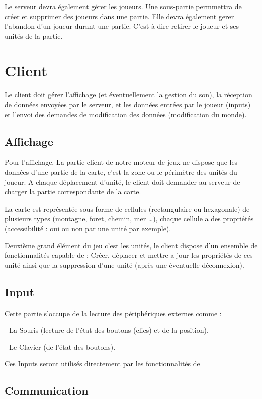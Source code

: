 \documentclass[a4paper,10pt]{report}
\begin{document}
	Le serveur devra également gérer les joueurs. Une sous-partie permmettra de créer et supprimer des joueurs dans une partie. Elle devra également gerer l'abandon d'un joueur durant une partie. C'est à dire retirer le joueur et ses unités de la partie.

    \section{Client}

      Le client doit gérer l'affichage (et éventuellement la gestion du son), la réception de données envoyées par le serveur, et les données entrées par le joueur (inputs) et l'envoi des demandes de modification des données (modification du monde).

      \subsection{Affichage}

	Pour l’affichage, La partie client de notre moteur de jeux ne dispose que les données d’une partie de la carte, c’est la zone ou le périmètre des unités du joueur. A chaque déplacement d’unité, le client doit demander au serveur de charger la partie  correspondante de la carte.

	La carte est représentée sous forme de cellules (rectangulaire ou hexagonale) de plusieurs types (montagne, foret, chemin, mer …), chaque cellule a des propriétés (accessibilité : oui ou non par une unité par exemple).

	Deuxième grand élément du jeu c’est les unités, le client dispose d’un ensemble de fonctionnalités capable de : Créer, déplacer et mettre a jour les propriétés de ces unité ainsi que la suppression d’une unité (après une éventuelle déconnexion).

      \subsection{Input}

	Cette partie s'occupe de la lecture des périphériques externes comme :

	- La Souris (lecture de l'état des boutons (clics) et de la position).

	- Le Clavier (de l'état des boutons).

	Ces Inputs seront utilisés directement par les fonctionnalités de

      \subsection{Communication}
\end{document}
